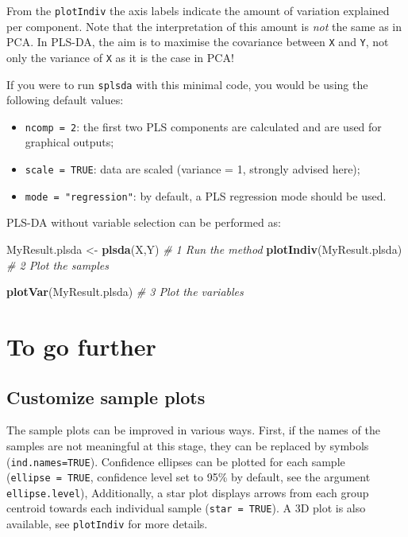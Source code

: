 \documentclass[]{book}
\newenvironment{Shaded}{\begin{snugshade}}{\end{snugshade}}
\newcommand{\CommentTok}[1]{\textcolor[rgb]{0.56,0.35,0.01}{\textit{#1}}}
\newcommand{\KeywordTok}[1]{\textcolor[rgb]{0.13,0.29,0.53}{\textbf{#1}}}
\newcommand{\NormalTok}[1]{#1}
\newcommand{\StringTok}[1]{\textcolor[rgb]{0.31,0.60,0.02}{#1}}
\providecommand{\tightlist}{%
  \setlength{\itemsep}{0pt}\setlength{\parskip}{0pt}}
\begin{document}
From the \texttt{plotIndiv} the axis labels indicate the amount of variation explained per component. Note that the interpretation of this amount is \emph{not} the same as in PCA. In PLS-DA, the aim is to maximise the covariance between \texttt{X} and \texttt{Y}, not only the variance of \texttt{X} as it is the case in PCA!

If you were to run \texttt{splsda} with this minimal code, you would be using the following default values:

\begin{itemize}
\tightlist
\item
  \texttt{ncomp\ =\ 2}: the first two PLS components are calculated and are used for graphical outputs;
\item
  \texttt{scale\ =\ TRUE}: data are scaled (variance = 1, strongly advised here);
\item
  \texttt{mode\ =\ "regression"}: by default, a PLS regression mode should be used.
\end{itemize}

PLS-DA without variable selection can be performed as:

\begin{Shaded}
\begin{Highlighting}[]
\NormalTok{MyResult.plsda <-}\StringTok{ }\KeywordTok{plsda}\NormalTok{(X,Y) }\CommentTok{# 1 Run the method}
\KeywordTok{plotIndiv}\NormalTok{(MyResult.plsda)    }\CommentTok{# 2 Plot the samples}
\end{Highlighting}
\end{Shaded}

\begin{Shaded}
\begin{Highlighting}[]
\KeywordTok{plotVar}\NormalTok{(MyResult.plsda)      }\CommentTok{# 3 Plot the variables}
\end{Highlighting}
\end{Shaded}

\hypertarget{plsda-tgf}{%
\section{To go further}\label{plsda-tgf}}

\hypertarget{splsda:plotIndiv}{%
\subsection{Customize sample plots}\label{splsda:plotIndiv}}

The sample plots can be improved in various ways. First, if the names of the samples are not meaningful at this stage, they can be replaced by symbols (\texttt{ind.names=TRUE}). Confidence ellipses can be plotted for each sample (\texttt{ellipse\ =\ TRUE}, confidence level set to 95\% by default, see the argument \texttt{ellipse.level}), Additionally, a star plot displays arrows from each group centroid towards each individual sample (\texttt{star\ =\ TRUE}). A 3D plot is also available, see \texttt{plotIndiv} for more details.
\end{document}
